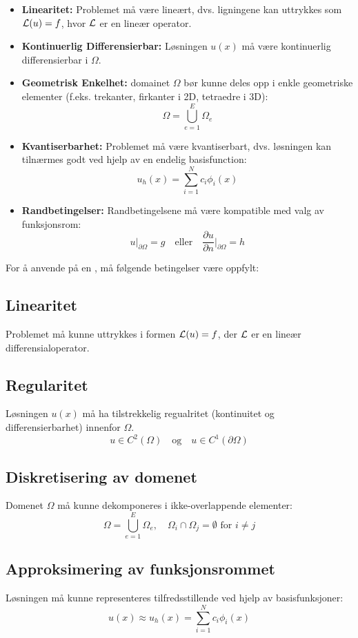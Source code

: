 \begin{itemize}
	\item \textbf{Linearitet:} Problemet må være lineært, dvs. ligningene kan uttrykkes som \(\mathcal{L}(u) = f\), hvor \(\mathcal{L}\) er en lineær operator.
	\item \textbf{Kontinuerlig Differensierbar:} Løsningen \( u(x) \) må være kontinuerlig differensierbar i \( \Omega \).
	\item \textbf{Geometrisk Enkelhet:} \gls{domain}et \( \Omega \) bør kunne deles opp i enkle geometriske elementer (f.eks. trekanter, firkanter i 2D, tetraedre i 3D):
	      \[
		      \Omega = \bigcup_{e=1}^{E} \Omega_e
	      \]
	\item \textbf{Kvantiserbarhet:} Problemet må være kvantiserbart, dvs. løsningen kan tilnærmes godt ved hjelp av en endelig \gls{basisfunction}:
	      \[
		      u_h(x) = \sum_{i=1}^{N} c_i \phi_i(x)
	      \]
	\item \textbf{Randbetingelser:} Randbetingelsene må være kompatible med valg av funksjonsrom:
	      \[
		      u|_{\partial \Omega} = g \quad \text{eller} \quad \frac{\partial u}{\partial n}\bigg|_{\partial \Omega} = h
	      \]
\end{itemize}

For å anvende  på en , må følgende betingelser være oppfylt:

\subsection{Linearitet} Problemet må kunne uttrykkes i formen \(\mathcal{L}(u) = f\), der \(\mathcal{L}\) er en lineær differensialoperator.

\subsection{Regularitet} Løsningen \( u(x) \) må ha tilstrekkelig regualritet (kontinuitet og differensierbarhet) innenfor \( \Omega \).
\[
	u \in C^2(\Omega) \quad \text{og} \quad u \in C^1(\partial \Omega)
\]

\subsection{Diskretisering av domenet} Domenet \( \Omega \) må kunne dekomponeres i ikke-overlappende elementer:
\[
	\Omega = \bigcup_{e=1}^{E} \Omega_e, \quad \Omega_i \cap \Omega_j = \emptyset \text{ for } i \neq j
\]

\subsection{Approksimering av funksjonsrommet}
Løsningen må kunne representeres tilfredsstillende ved hjelp av basisfunksjoner:
\[
	u(x) \approx u_h(x) = \sum_{i=1}^{N} c_i \phi_i(x)
\]

